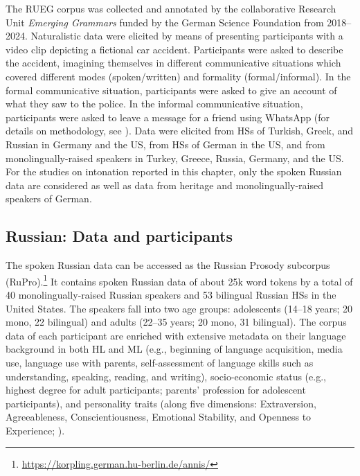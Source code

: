 \documentclass[output=paper,colorlinks,citecolor=brown]{langscibook}
\begin{document}
The RUEG corpus \citep{RUEGcorpus2024} was collected and annotated by the collaborative Research Unit \textit{Emerging Grammars} funded by the German Science Foundation from 2018--2024. Naturalistic data were elicited by means of presenting participants with a video clip depicting a fictional car accident. Participants were asked to describe the accident, imagining themselves in different communicative situations which covered different modes (spoken/written) and formality (formal/informal). In the formal communicative situation, participants were asked to give an account of what they saw to the police. In the informal communicative situation, participants were asked to leave a message for a friend using WhatsApp (for details on methodology, see \cite{Wiese_2020}). Data were elicited from HSs of Turkish, Greek, and Russian in Germany and the US, from HSs of German in the US, and from monolingually-raised speakers in Turkey, Greece, Russia, Germany, and the US. For the studies on intonation reported in this chapter, only the spoken Russian data are considered as well as data from heritage and monolingually-raised speakers of German.

\subsection{Russian: Data and participants} \label{chapter12:section 2.1}
The spoken Russian data can be accessed as the Russian Prosody subcorpus (RuPro).\footnote{\url{https://korpling.german.hu-berlin.de/annis/}} It contains spoken Russian data of about 25k word tokens by a total of 40 monolingually-raised Russian speakers and 53 bilingual Russian HSs in the United States. The speakers fall into two age groups: adolescents (14--18 years; 20 mono, 22 bilingual) and adults (22--35 years; 20 mono, 31 bilingual). The corpus data of each participant are enriched with extensive metadata on their language background in both HL and ML (e.g., beginning of language acquisition, media use, language use with parents, self-assessment of language skills such as understanding, speaking, reading, and writing), socio-economic status (e.g., highest degree for adult participants; parents’ profession for adolescent participants), and personality traits (along five dimensions: Extraversion, Agreeableness, Conscientiousness, Emotional Stability, and Openness to Experience; \cite{GoslingSwann2003}).
\end{document}
